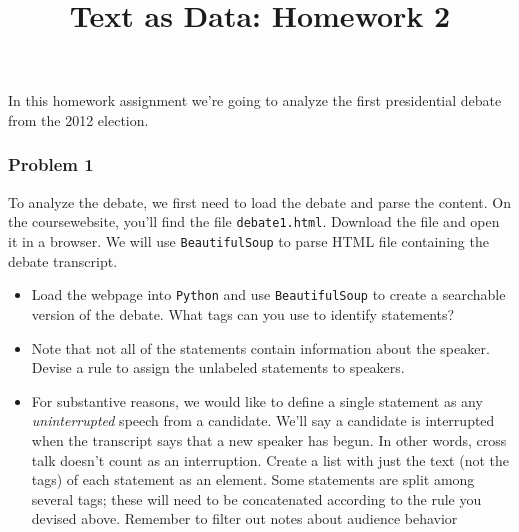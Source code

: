 \documentclass[12pt,letterpaper]{article}
\title{Text as Data: Homework 2}
\date{}
\begin{document}
\maketitle


In this homework assignment we're going to analyze the first presidential debate from the 2012 election.  \\

\subsubsection*{Problem 1} 
To analyze the debate, we first need to load the debate and parse the content.  On the coursewebsite, you'll find the file {\tt debate1.html}.  Download the file and open it in a browser. We will use {\tt BeautifulSoup} to parse HTML file containing the debate transcript.

\begin{itemize}
\item Load the webpage into {\tt Python} and use {\tt BeautifulSoup} to create a searchable version of the debate. What tags can you use to identify statements? 

\item Note that not all of the statements contain information about the speaker. Devise a rule to assign the unlabeled statements to speakers.

\item For substantive reasons, we would like to define a single statement as any \textit{uninterrupted} speech from a candidate. We'll say a candidate is interrupted when the transcript says that a new speaker has begun.  In other words, cross talk doesn't count as an interruption. Create a list with just the text (not the tags) of each statement as an element. Some statements are split among several tags; these will need to be concatenated according to the rule you devised above. Remember to filter out notes about audience behavior

\end{itemize}
\end{document}

